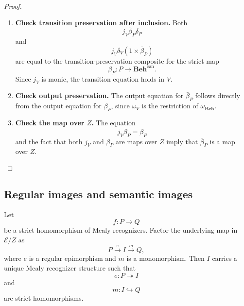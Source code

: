 \begin{proof}
    \leavevmode
    \begin{enumerate}
        \item \textbf{Check transition preservation after inclusion.}
        Both
        \[
            j_V\bar\beta_P\delta_P
        \]
        and
        \[
            j_V\delta_V(1\times\bar\beta_P)
        \]
        are equal to the transition-preservation composite for the strict map
        \[
            \beta_P:P\to\mathbf{Beh}^{\mathrm{can}}.
        \]
        Since \(j_V\) is monic, the transition equation holds in \(V\).

        \item \textbf{Check output preservation.}
        The output equation for \(\bar\beta_P\) follows directly from the output
        equation for \(\beta_P\), since \(\omega_V\) is the restriction of
        \(\omega_{\mathbf{Beh}}\).

        \item \textbf{Check the map over \(Z\).}
        The equation
        \[
            j_V\bar\beta_P=\beta_P
        \]
        and the fact that both \(j_V\) and \(\beta_P\) are maps over \(Z\)
        imply that \(\bar\beta_P\) is a map over \(Z\).
    \end{enumerate}
\end{proof}

\subsection{Regular images and semantic images}
\label{subsec:regular-semantic-images}

\begin{proposition}
\label{prop:regular-image-factorization-recognizers}
    Let
    \[
        f:P\to Q
    \]
    be a strict homomorphism of Mealy recognizers. Factor the underlying map in
    \(\mathcal E/Z\) as
    \[
        P\xrightarrow{e}I\xrightarrow{m}Q,
    \]
    where \(e\) is a regular epimorphism and \(m\) is a monomorphism. Then \(I\)
    carries a unique Mealy recognizer structure such that
    \[
        e:P\twoheadrightarrow I
    \]
    and
    \[
        m:I\hookrightarrow Q
    \]
    are strict homomorphisms.
\end{proposition}


